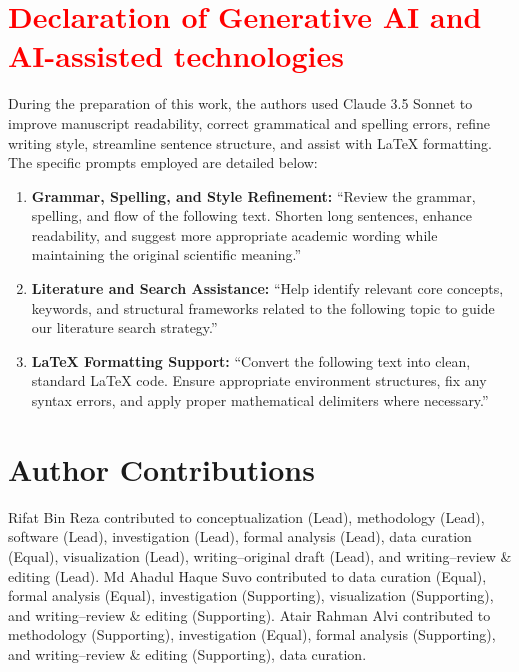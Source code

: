 \documentclass{elektr}
\begin{document}
\section*{\textcolor{red}{Declaration of Generative AI and AI-assisted technologies}}

During the preparation of this work, the authors used Claude 3.5 Sonnet to improve manuscript readability, correct grammatical and spelling errors, refine writing style, streamline sentence structure, and assist with LaTeX formatting. The specific prompts employed are detailed below:

\begin{enumerate}
    \item \textbf{Grammar, Spelling, and Style Refinement:} ``Review the grammar, spelling, and flow of the following text. Shorten long sentences, enhance readability, and suggest more appropriate academic wording while maintaining the original scientific meaning.''
    \item \textbf{Literature and Search Assistance:} ``Help identify relevant core concepts, keywords, and structural frameworks related to the following topic to guide our literature search strategy.''
    \item \textbf{LaTeX Formatting Support:} ``Convert the following text into clean, standard LaTeX code. Ensure appropriate environment structures, fix any syntax errors, and apply proper mathematical delimiters where necessary.''
\end{enumerate}

\section{Author Contributions}

Rifat Bin Reza contributed to conceptualization (Lead), methodology (Lead),
software (Lead), investigation (Lead), formal analysis (Lead), data curation
(Equal), visualization (Lead), writing--original draft (Lead), and
writing--review \& editing (Lead). Md Ahadul Haque Suvo contributed to data
curation (Equal), formal analysis (Equal), investigation (Supporting),
visualization (Supporting), and writing--review \& editing (Supporting).
Atair Rahman Alvi contributed to methodology (Supporting), investigation
(Equal), formal analysis (Supporting), and writing--review \& editing (Supporting), data curation.
\end{document}
